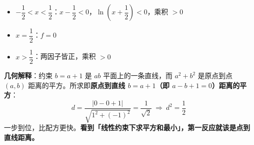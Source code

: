 \begin{answer}
\begin{itemize}
\item $-\dfrac12<x<\dfrac12$：$x-\dfrac12<0$，$\ln\left(x+\dfrac12\right)<0$，乘积 $>0$ 
\item $x=\dfrac12$：$f=0$ 
\item $x>\dfrac12$：两因子皆正，乘积 $>0$ 
\end{itemize}

\begin{gktip}
\textbf{几何解释}：约束 $b=a+1$ 是 $ab$ 平面上的一条直线，而 $a^{2}+b^{2}$ 是原点到点 $(a,b)$ 距离的平方。所求即\textbf{原点到直线 $b=a+1$（即 $a-b+1=0$）距离的平方}：
\nopagebreak[4]
\[d=\frac{|0-0+1|}{\sqrt{1^{2}+(-1)^{2}}}=\frac1{\sqrt2}\ \Longrightarrow\ d^{2}=\frac12\]
一步到位，比配方更快。\textbf{看到「线性约束下求平方和最小」，第一反应就该是点到直线距离。}
\end{gktip}


\par\medskip

\end{answer}

